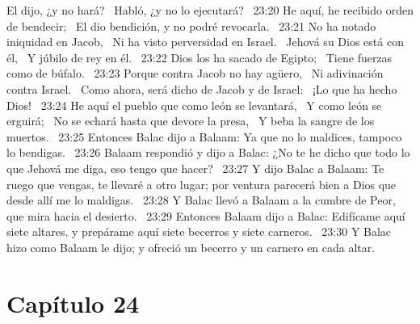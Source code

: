El dijo, ¿y no hará?  
Habló, ¿y no lo ejecutará?  
23:20 He aquí, he recibido orden de bendecir;  
El dio bendición, y no podré revocarla.  
23:21 No ha notado iniquidad en Jacob,  
Ni ha visto perversidad en Israel.  
Jehová su Dios está con él,  
Y júbilo de rey en él.  
23:22 Dios los ha sacado de Egipto;  
Tiene fuerzas como de búfalo.  
23:23 Porque contra Jacob no hay agüero,  
Ni adivinación contra Israel.  
Como ahora, será dicho de Jacob y de Israel:  
¡Lo que ha hecho Dios!  
23:24 He aquí el pueblo que como león se levantará,  
Y como león se erguirá;  
No se echará hasta que devore la presa,  
Y beba la sangre de los muertos.  
23:25 Entonces Balac dijo a Balaam: Ya que no lo maldices, tampoco lo bendigas.  
23:26 Balaam respondió y dijo a Balac: ¿No te he dicho que todo lo que Jehová me diga, eso tengo que hacer?  
23:27 Y dijo Balac a Balaam: Te ruego que vengas, te llevaré a otro lugar; por ventura parecerá bien a Dios que desde allí me lo maldigas.  
23:28 Y Balac llevó a Balaam a la cumbre de Peor, que mira hacia el desierto.  
23:29 Entonces Balaam dijo a Balac: Edifícame aquí siete altares, y prepárame aquí siete becerros y siete carneros.  
23:30 Y Balac hizo como Balaam le dijo; y ofreció un becerro y un carnero en cada altar.  
\section*{Capítulo 24 }

